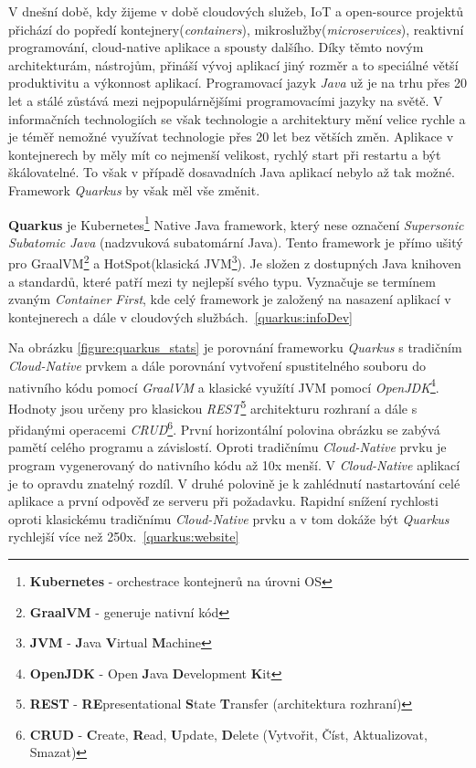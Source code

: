 V dnešní době, kdy žijeme v době cloudových služeb, IoT a open-source projektů přichází do popředí kontejnery(\emph{containers}), mikroslužby(\emph{microservices}), reaktivní programování, cloud-native aplikace a spousty dalšího.
Díky těmto novým architekturám, nástrojům, přináší vývoj aplikací jiný rozměr a to speciálné větší produktivitu a výkonnost aplikací. Programovací jazyk \emph{Java} už je na trhu přes 20 let a stálé zůstává mezi nejpopulárnějšími programovacími jazyky na světě.
V informačních technologiích se však technologie a architektury mění velice rychle a je téměř nemožné využívat technologie přes 20 let bez větších změn. Aplikace v kontejnerech by měly mít co nejmenší velikost, rychlý start při restartu a být škálovatelné.
To však v případě dosavadních Java aplikací nebylo až tak možné. Framework \emph{Quarkus} by však měl vše změnit.

\textbf{Quarkus} je Kubernetes\footnote{\textbf{Kubernetes} - orchestrace kontejnerů na úrovni OS} Native Java framework, který nese označení \emph{Supersonic Subatomic Java} (nadzvuková subatomární Java). Tento framework je přímo ušitý pro GraalVM\footnote{\textbf{GraalVM} - generuje nativní kód} a HotSpot(klasická JVM\footnote{\textbf{JVM} - \textbf{J}ava \textbf{V}irtual \textbf{M}achine}).
Je složen z dostupných Java knihoven a standardů, které patří mezi ty nejlepší svého typu. Vyznačuje se termínem zvaným \emph{Container First}, kde celý framework je založený na nasazení aplikací v kontejnerech a dále v cloudových službách.~\ref{quarkus:infoDev}

Na obrázku \ref{figure:quarkus_stats} je porovnání frameworku \emph{Quarkus} s tradičním \emph{Cloud-Native} prvkem a dále porovnání vytvoření spustitelného souboru do nativního kódu pomocí \emph{GraalVM} a klasické využítí JVM pomocí \emph{OpenJDK}\footnote{\textbf{OpenJDK} - Open \textbf{J}ava \textbf{D}evelopment \textbf{K}it}.
Hodnoty jsou určeny pro klasickou \emph{REST}\footnote{\textbf{REST} - \textbf{RE}presentational \textbf{S}tate \textbf{T}ransfer (architektura rozhraní)} architekturu rozhraní a dále s přidanými operacemi \emph{CRUD}\footnote{\textbf{CRUD} - \textbf{C}reate, \textbf{R}ead, \textbf{U}pdate, \textbf{D}elete (Vytvořit, Číst, Aktualizovat, Smazat)}.
První horizontální polovina obrázku se zabývá pamětí celého programu a závislostí. Oproti tradičnímu \emph{Cloud-Native} prvku je program vygenerovaný do nativního kódu až 10x menší. V \emph{Cloud-Native} aplikací je to opravdu znatelný rozdíl.
V druhé polovině je k zahlédnutí nastartování celé aplikace a první odpověď ze serveru při požadavku. Rapidní snížení rychlosti oproti klasickému tradičnímu \emph{Cloud-Native} prvku a v tom dokáže být \emph{Quarkus} rychlejší více než 250x.~\ref{quarkus:website}


